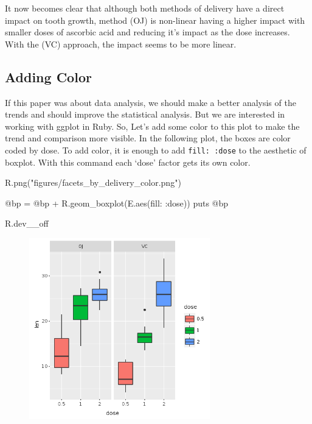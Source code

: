 \documentclass[11pt,]{article}
\newenvironment{Shaded}{\begin{snugshade}}{\end{snugshade}}
\newcommand{\StringTok}[1]{\textcolor[rgb]{0.31,0.60,0.02}{#1}}
\newcommand{\OtherTok}[1]{\textcolor[rgb]{0.56,0.35,0.01}{#1}}
\newcommand{\NormalTok}[1]{#1}
\begin{document}
It now becomes clear that although both methods of delivery have a
direct impact on tooth growth, method (OJ) is non-linear having a higher
impact with smaller doses of ascorbic acid and reducing it's impact as
the dose increases. With the (VC) approach, the impact seems to be more
linear.

\subsection{Adding Color}\label{adding-color}

If this paper was about data analysis, we should make a better analysis
of the trends and should improve the statistical analysis. But we are
interested in working with ggplot in Ruby. So, Let's add some color to
this plot to make the trend and comparison more visible. In the
following plot, the boxes are color coded by dose. To add color, it is
enough to add \texttt{fill:\ :dose} to the aesthetic of boxplot. With
this command each `dose' factor gets its own color.

\begin{Shaded}
\begin{Highlighting}[]
\NormalTok{R.png(}\StringTok{"figures/facets_by_delivery_color.png"}\NormalTok{)}

\OtherTok{@bp}\NormalTok{ = }\OtherTok{@bp}\NormalTok{ + R.geom_boxplot(E.aes(}\StringTok{fill: :dose}\NormalTok{))}
\NormalTok{puts }\OtherTok{@bp}

\NormalTok{R.dev__off}
\end{Highlighting}
\end{Shaded}

\begin{figure}
\centering
\includegraphics[width=0.70000\textwidth]{figures/facets_by_delivery_color.png}
\caption{}
\end{figure}
\end{document}
